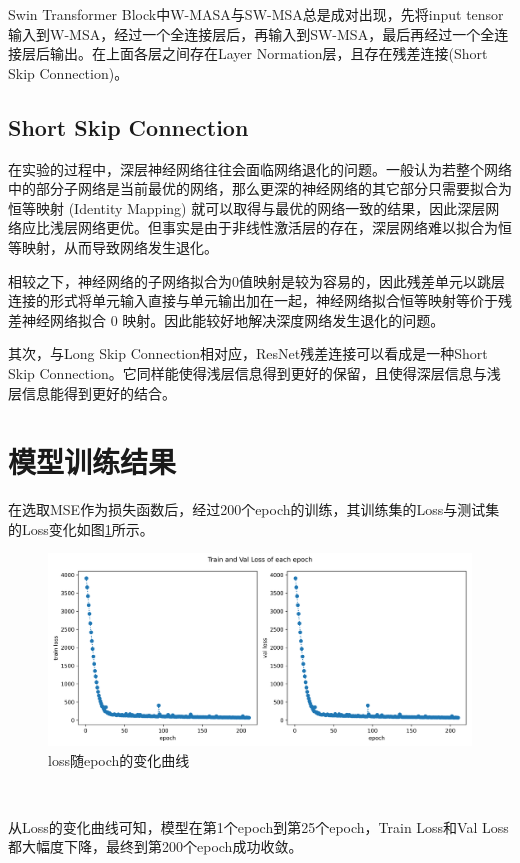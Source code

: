 Swin Transformer Block中W-MASA与SW-MSA总是成对出现，先将input tensor输入到W-MSA，经过一个全连接层后，再输入到SW-MSA，最后再经过一个全连接层后输出。在上面各层之间存在Layer Normation层，且存在残差连接(Short Skip Connection)。

\subsection{Short Skip Connection}
在实验的过程中，深层神经网络往往会面临网络退化的问题。一般认为若整个网络中的部分子网络是当前最优的网络，那么更深的神经网络的其它部分只需要拟合为恒等映射 (Identity Mapping) 就可以取得与最优的网络一致的结果，因此深层网络应比浅层网络更优。但事实是由于非线性激活层的存在，深层网络难以拟合为恒等映射，从而导致网络发生退化。

相较之下，神经网络的子网络拟合为0值映射是较为容易的，因此残差单元以跳层连接的形式将单元输入直接与单元输出加在一起，神经网络拟合恒等映射等价于残差神经网络拟合 0 映射。因此能较好地解决深度网络发生退化的问题。

其次，与Long Skip Connection相对应，ResNet残差连接可以看成是一种Short Skip Connection。它同样能使得浅层信息得到更好的保留，且使得深层信息与浅层信息能得到更好的结合。

\section{模型训练结果}
在选取MSE作为损失函数后，经过200个epoch的训练，其训练集的Loss与测试集的Loss变化如图\ref{img505}所示。

\begin{figure}[h]
	\centering
	\includegraphics[width=0.9\columnwidth]{image/chap05/img505.png}
	\caption{loss随epoch的变化曲线}
	\label{img505}
\end{figure}

\hspace*{\fill} \

从Loss的变化曲线可知，模型在第1个epoch到第25个epoch，Train Loss和Val Loss都大幅度下降，最终到第200个epoch成功收敛。

